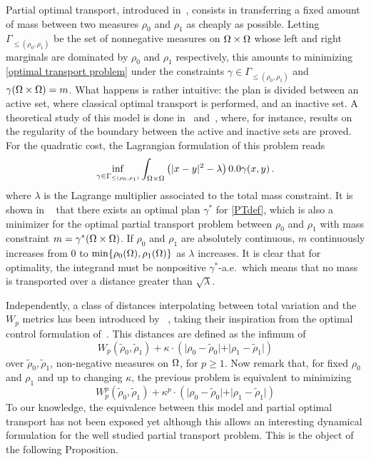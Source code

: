 Partial optimal transport, introduced in~\cite{caffarelli2010free}, consists in transferring a fixed amount of mass between two measures $\rho_0$ and $\rho_1$ as cheaply as possible.
Letting $\Gamma_{\leq(\rho_0,\rho_1)}$ be the set of nonnegative measures on $\Omega \times \Omega$ whose left and right marginals are dominated by $\rho_0$ and $\rho_1$ respectively, this amounts to minimizing \eqref{optimal transport problem} under the constraints $\gamma \in \Gamma_{\leq(\rho_0,\rho_1)}$ and $ \gamma (\Omega \times \Omega)=m$. 
What happens is rather intuitive: the plan is divided between an active set, where classical optimal transport is performed, and an inactive set. A theoretical study of this model is done in~\cite{caffarelli2010free} and~\cite{figalli2010optimal}, where, for instance, results on the regularity of the boundary between the active and inactive sets are proved.
%
For the quadratic cost, the Lagrangian formulation of this problem reads
\begin{equation}
\inf_{\gamma \in \Gamma_{\leq(\rho_0,\rho_1)}} \int_{\Om \times \Om} \left( \vert x-y\vert^2 -\lambda \right) \d\gamma (x,y) \, .
\label{PTdef}
\end{equation}
where $\lambda$ is the Lagrange multiplier associated to the total mass constraint. It is shown in ~\cite[Corollary 2.11]{caffarelli2010free} that there exists an optimal plan $\gamma^*$ for \eqref{PTdef}, which is also a minimizer for the optimal partial transport problem between $\rho_0$ and $\rho_1$ with mass constraint $m=\gamma^*(\Omega \times \Omega)$. If $\rho_0$ and $\rho_1$ are absolutely continuous, $m$ continuously increases from $0$ to $\min \{ \rho_0(\Omega), \rho_1(\Omega) \}$ as $\lambda$ increases. It is clear that for optimality, the integrand must be nonpositive $\gamma^*$-a.e.\, which means that no mass is transported over a distance greater than $\sqrt{\lambda}$.

Independently, a class of distances interpolating between total variation and the $W_p$ metrics has been introduced by ~\cite{piccoli2014generalized, piccoli2013properties}, taking their inspiration from the optimal control formulation of~\cite{benamou2001mixed}. 
This distances are defined as the infimum of
\[
W_p (\tilde{\rho}_0,\tilde{\rho}_1) + 
\kappa \cdot
(  \vert \rho_0 - \tilde{\rho}_0 \vert + \vert \rho_1 - \tilde{\rho}_1 \vert  )
\]
over $\tilde{\rho}_0, \tilde{\rho}_1$, non-negative measures on $\Omega$, for $p \geq 1$. Now remark that, for fixed $\rho_0$ and $\rho_1$ and up to changing $\kappa$, the previous problem is equivalent to minimizing
\begin{equation}
W^p_p (\tilde{\rho}_0,\tilde{\rho}_1) + 
\kappa^p \cdot
(  \vert \rho_0 - \tilde{\rho}_0 \vert + \vert \rho_1 - \tilde{\rho}_1 \vert  )
\label{PRdef}
\end{equation}
To our knowledge, the equivalence between this model and partial optimal transport has not been exposed yet although this allows an interesting dynamical formulation for the well studied partial transport problem. This is the object of the following Proposition.


